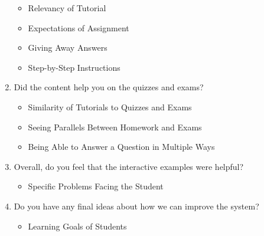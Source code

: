 \begin{enumerate}
\begin{itemize}
		\item Relevancy of Tutorial
		\item Expectations of Assignment
		\item Giving Away Answers
		\item Step-by-Step Instructions
	\end{itemize}
	\item Did the content help you on the quizzes and exams?
	\begin{itemize}
		\item Similarity of Tutorials to Quizzes and Exams
		\item Seeing Parallels Between Homework and Exams
		\item Being Able to Answer a Question in Multiple Ways
	\end{itemize}
	\item Overall, do you feel that the interactive examples were helpful?
	\begin{itemize}
		\item Specific Problems Facing the Student
	\end{itemize}
	\item Do you have any final ideas about how we can improve the system?
	\begin{itemize}
		\item Learning Goals of Students
	\end{itemize}
\end{enumerate}